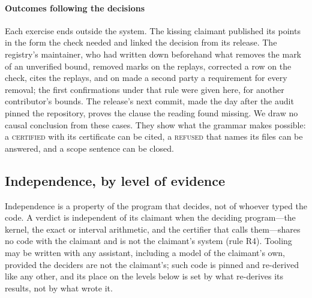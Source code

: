 \documentclass[preprint,11pt,a4paper]{elsarticle}
\theoremstyle{definition}
\newcommand{\verdict}[1]{\textup{\textsc{#1}}}
\newcommand{\CERT}{\verdict{certified}}
\newcommand{\REFS}{\verdict{refused}}
\begin{document}
\paragraph{Outcomes following the decisions}
Each exercise ends outside the system. The kissing claimant published its points in the form the check needed and linked the decision from its release. The registry's maintainer, who had written down beforehand what removes the mark of an unverified bound, removed \MtRgMarksTotalWord{} marks on the replays, corrected a row on the check, cites the replays, and on \MtRgThirdDate{} made a second party a requirement for every removal; the first confirmations under that rule were given here, for another contributor's bounds. The release's next commit, made the day after the audit pinned the repository, proves the clause the reading found missing. We draw no causal conclusion from these cases. They show what the grammar makes possible: a \CERT{} with its certificate can be cited, a \REFS{} that names its files can be answered, and a scope sentence can be closed.

\subsection{Independence, by level of evidence}\label{sec:independence}

Independence is a property of the program that decides, not of whoever typed the code. A verdict is independent of its claimant when the deciding program---the kernel, the exact or interval arithmetic, and the certifier that calls them---shares no code with the claimant and is not the claimant's system (rule R4). Tooling may be written with any assistant, including a model of the claimant's own, provided the deciders are not the claimant's; such code is pinned and re-derived like any other, and its place on the levels below is set by what re-derives its results, not by what wrote it.
\end{document}
